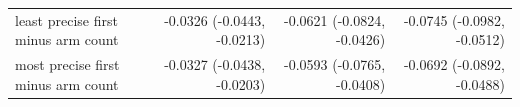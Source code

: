 \begin{tabular}{lrrr}
least precise first minus arm count & -0.0326 (-0.0443, -0.0213) & -0.0621 (-0.0824, -0.0426) & -0.0745 (-0.0982, -0.0512) \\
most precise first minus arm count & -0.0327 (-0.0438, -0.0203) & -0.0593 (-0.0765, -0.0408) & -0.0692 (-0.0892, -0.0488) \\

\end{tabular}
